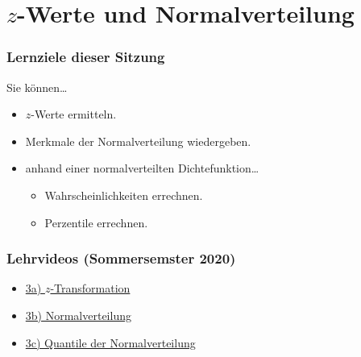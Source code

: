 \documentclass[
  11pt,
  ngerman,
  a4paper,
]{report}
\providecommand{\tightlist}{%
  \setlength{\itemsep}{0pt}\setlength{\parskip}{0pt}}
\begin{document}
\hypertarget{z-werte-und-normalverteilung}{%
\chapter{\texorpdfstring{\(z\)-Werte und Normalverteilung}{z-Werte und Normalverteilung}}\label{z-werte-und-normalverteilung}}

\hypertarget{lernziele-dieser-sitzung-2}{%
\subsection*{Lernziele dieser Sitzung}\label{lernziele-dieser-sitzung-2}}

Sie können\ldots{}

\begin{itemize}
\tightlist
\item
  \(z\)-Werte ermitteln.
\item
  Merkmale der Normalverteilung wiedergeben.
\item
  anhand einer normalverteilten Dichtefunktion\ldots{}

  \begin{itemize}
  \tightlist
  \item
    Wahrscheinlichkeiten errechnen.
  \item
    Perzentile errechnen.
  \end{itemize}
\end{itemize}

\hypertarget{lehrvideos-sommersemster-2020}{%
\subsection*{Lehrvideos (Sommersemster 2020)}\label{lehrvideos-sommersemster-2020}}

\begin{itemize}
\tightlist
\item
  \href{https://video01.uni-frankfurt.de/Mediasite/Play/8c755eed883b4ea0924481da818b742f1d}{3a) \(z\)-Transformation}
\item
  \href{https://video01.uni-frankfurt.de/Mediasite/Play/26e839cc0d8d43d2a74c2c03b76aa6421d}{3b) Normalverteilung}
\item
  \href{https://video01.uni-frankfurt.de/Mediasite/Play/902e68deb21045a79473a249303558d11d}{3c) Quantile der Normalverteilung}
\end{itemize}
\end{document}
